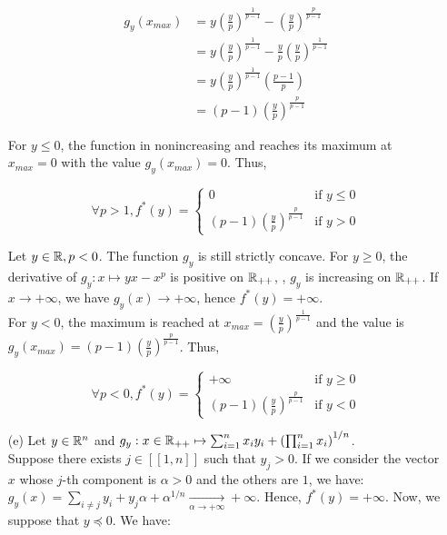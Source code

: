 \documentclass[a4paper, 11pt]{report}
\begin{document}
\begin{itemize}
    \begin{equation*}
        \begin{split}
        g_{y}(x_{max}) &= y \left( \frac{y}{p} \right)^{\frac{1}{p-1}} - \left( \frac{y}{p} \right)^{\frac{p}{p-1}} \\
        &= y \left( \frac{y}{p} \right)^{\frac{1}{p-1}} - \frac{y}{p} \left( \frac{y}{p} \right)^{\frac{1}{p-1}} \\
        &= y \left( \frac{y}{p} \right)^{\frac{1}{p-1}} \left( \frac{p-1}{p} \right) \\
        &= \left( p-1 \right) \left( \frac{y}{p} \right)^{\frac{p}{p-1}}
        \end{split}
    \end{equation*}
    
    For $y \leq 0$, the function in nonincreasing and reaches its maximum at $x_{max} = 0$ with the value $g_{y}(x_{max}) = 0$. Thus,
    
    \[ \boxed{\forall p > 1, f^{*}(y) = 
    \begin{cases}
        0 & \text{if } y \leq 0 \\
        \left( p-1 \right) \left( \frac{y}{p} \right)^{\frac{p}{p-1}} & \text{if } y > 0
    \end{cases}} \]
    
    Let $y \in \mathbb{R}, p < 0$. The function $g_{y}$ is still strictly concave. For $y \geq 0$, the derivative of $g_{y}: x \mapsto yx - x^{p}$ is positive on $\mathbb{R}_{++}$, \ie, $g_{y}$ is increasing on $\mathbb{R}_{++}$. If $x \longrightarrow + \infty$, we have $g_{y}(x) \longrightarrow + \infty$, hence $f^{*}(y) = + \infty$. \\
    For $y < 0$, the maximum is reached at $x_{max} = \left( \frac{y}{p} \right)^{\frac{1}{p-1}}$ and the value is $g_{y}(x_{max}) = \left( p-1 \right) \left( \frac{y}{p} \right)^{\frac{p}{p-1}}$. Thus,
    
    \[ \boxed{\forall p < 0, f^{*}(y) = 
    \begin{cases}
        + \infty & \text{if } y \geq 0 \\
        \left( p-1 \right) \left( \frac{y}{p} \right)^{\frac{p}{p-1}} & \text{if } y < 0
    \end{cases}} \]
    
    \item[(e)] Let $y \in \mathbb{R}^{n}$ and $g_{y}: x \in \mathbb{R}_{++} \mapsto \sum_{i=1}^{n}x_{i}y_{i} + \left( \prod_{i=1}^{n} x_{i} \right)^{1/n}$. \\
    Suppose there exists $j \in [\![ 1, n ]\!]$ such that $y_{j} > 0$. If we consider the vector $x$ whose $j$-th component is $\alpha > 0$ and the others are $1$, we have: $g_{y}(x) = \sum_{i \neq j} y_{i} + y_{j} \alpha + \alpha^{1/n} \underset{\alpha \rightarrow + \infty}{\longrightarrow} + \infty$. Hence, $f^{*}(y) = + \infty$. Now, we suppose that $y \preceq 0$. We have:
    

\end{itemize}
\end{document}
